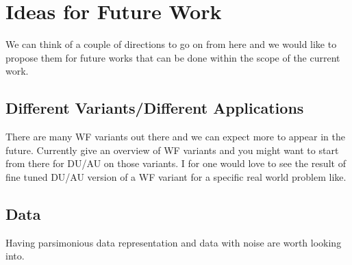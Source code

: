 



\section*{Ideas for Future Work}

We can think of a couple of directions to go on from here and we would like to propose them for future works that can be done within the scope of 
the current work.

\subsection*{Different Variants/Different Applications}

There are many \ac{WF}\cite{Jaganathan2015}\cite{Liu2019} variants out there and we can expect more to appear in the future. 
Currently \cite{Jaganathan2015}\cite{Liu2019}\cite{Chandra2017} give an overview of \ac{WF} variants and you might want to start from there for 
\ac{DU}/\ac{AU}\cite{Monga2019} on those variants. I for one would love to see the result of fine tuned 
\ac{DU}/\ac{AU}\cite{Monga2019} version of a \ac{WF} variant for a specific real world problem like\cite{Fogel2013}. 

\subsection*{Data}

Having parsimonious data representation\cite{Foucart2013} and data with noise are worth looking into.

